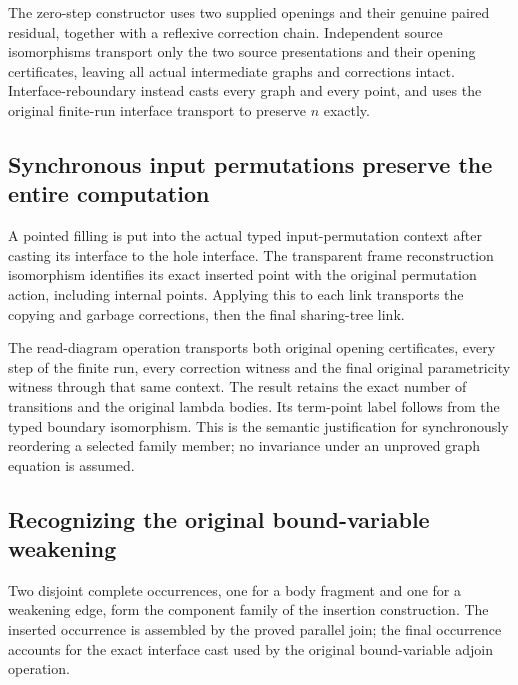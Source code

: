 The zero-step constructor uses two supplied openings and their genuine paired residual, together with a reflexive correction chain. Independent source isomorphisms transport only the two source presentations and their opening certificates, leaving all actual intermediate graphs and corrections intact. Interface-reboundary instead casts every graph and every point, and uses the original finite-run interface transport to preserve $n$ exactly.
\par{}

\subsection{Synchronous input permutations preserve the entire computation}
A pointed filling is put into the actual typed input-permutation context after casting its interface to the hole interface. The transparent frame reconstruction isomorphism identifies its exact inserted point with the original permutation action, including internal points. Applying this to each link transports the copying and garbage corrections, then the final sharing-tree link.

The read-diagram operation transports both original opening certificates, every step of the finite run, every correction witness and the final original parametricity witness through that same context. The result retains the exact number of transitions and the original lambda bodies. Its term-point label follows from the typed boundary isomorphism. This is the semantic justification for synchronously reordering a selected family member; no invariance under an unproved graph equation is assumed.
\par{}

\subsection{Recognizing the original bound-variable weakening}
Two disjoint complete occurrences, one for a body fragment and one for a weakening edge, form the component family of the insertion construction. The inserted occurrence is assembled by the proved parallel join; the final occurrence accounts for the exact interface cast used by the original bound-variable adjoin operation.

